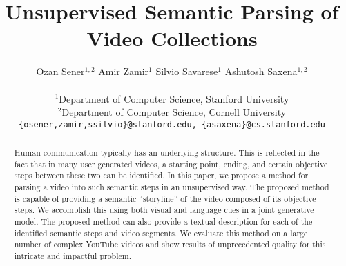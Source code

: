 \documentclass[10pt,twocolumn,letterpaper]{article}
\begin{document}
\title{Unsupervised Semantic Parsing of Video Collections}



\author{ Ozan Sener$^{1,2}$ \;\; Amir Zamir$^{1}$ \;\; Silvio Savarese$^{1}$ \;\; Ashutosh Saxena$^{1,2}$  \\ \\
$^1$Department of Computer Science, Stanford University\\
$^2$Department of Computer Science, Cornell University\\
{\tt\small \{osener,zamir,ssilvio\}@stanford.edu, \{asaxena\}@cs.stanford.edu}
}
\maketitle


\begin{spacing}{0.98}
\begin{abstract}
Human communication typically has an underlying structure. This is reflected in the fact that in many user generated videos, a starting point, ending, and certain objective steps between these two can be identified. In this paper, we propose a method for parsing a video into such semantic steps in an unsupervised way. The proposed method is capable of providing a semantic ``storyline'' of the video composed of its objective steps. We accomplish this using both visual and language cues in a joint generative model. The proposed method can also provide a textual description for each of the identified semantic steps and video segments. We evaluate this method on a large number of complex YouTube videos and show results of unprecedented quality for this intricate and impactful problem.
\end{abstract}
\vspace{-5mm}







%
\end{spacing}
{\footnotesize


}
\end{document}
